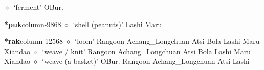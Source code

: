          $\diamond$~`ferment'
         OBur. 
  \item {\footnotesize \textbf{*puk}}{\tiny column-9868}
         $\diamond$~`shell (peanuts)'
         Lashi 
\hspace{1ex}
         Maru 
  \item {\footnotesize \textbf{*rak}}{\tiny column-12568}
         $\diamond$~`loom'
         Rangoon 
\hspace{1ex}
         Achang\_Longchuan 
\hspace{1ex}
         Atsi 
\hspace{1ex}
         Bola 
\hspace{1ex}
         Lashi 
\hspace{1ex}
         Maru 
\hspace{1ex}
         Xiandao 
\hspace{1ex}
         $\diamond$~`weave / knit'
         Rangoon 
\hspace{1ex}
         Achang\_Longchuan 
\hspace{1ex}
         Atsi 
\hspace{1ex}
         Bola 
\hspace{1ex}
         Lashi 
\hspace{1ex}
         Maru 
\hspace{1ex}
         Xiandao 
\hspace{1ex}
         $\diamond$~`weave (a basket)'
         OBur. 
\hspace{1ex}
         Rangoon 
\hspace{1ex}
         Achang\_Longchuan 
\hspace{1ex}
         Atsi 
\hspace{1ex}
         Lashi 
\hspace{1ex}
